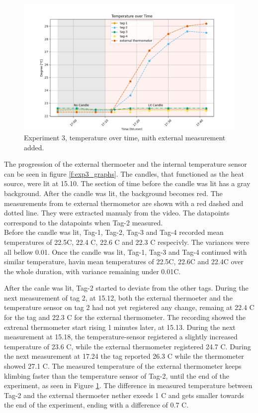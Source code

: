 \begin{figure}[ht!]
	\includegraphics[width=\linewidth]{graphics/exp/exp3_temp_plot_1.png}
	\caption{Experiment 3, temperature over time, mith external measurement added.}
	\label{f:exp3_graphs_temp}
\end{figure}

The progression of the external thermoeter and the internal temperature sensor can be seen in figure \ref{f:exp3_graphs}.
The candles, that functioned as the heat source, were lit at 15.10.
The section of time before the candle was lit has a gray background.
After the candle was lit, the background becomes red.
The measurements from te external thermometor are shown with a red dashed and dotted line.
They were extracted manualy from the video. The datapoints correspond to the datapoints when Tag-2 measured.\\
Before the candle was lit, Tag-1, Tag-2, Tag-3 and Tag-4 recorded mean temperatures of 22.5\degree C, 22.4 \degree C, 22.6 \degree C and 22.3 \degree C respecivly.
The variances were all bellow 0.01\degree.
Once the candle was lit, Tag-1, Tag-3 and Tag-4 continued with similar temperature, havin mean temperatures of 22.5\degree C, 22.6\degree C and 22.4\degree C over the whole duration, with variance remaining under 0.01\degree C.


After the canle was lit, Tag-2 started to deviate from the other tags.
During the next measurement of tag 2, at 15.12, both the external thermoeter and the temperature sensor on tag 2 had not yet registered any change, remaing at 22.4 \degree C for the tag and 22.3 \degree C for the external thermometer.
The recording showed the extrenal thermometer start rising 1 minutes later, at 15.13.
During the next measurement at 15.18, the temperature-sensor registered a slightly increased temperature of 23.6 \degree C, while the external thermometer registered 24.7 \degree C.
During the next measurement at 17.24 the tag reported 26.3 \degree C while the thermometer showed 27.1 \degree C. 
The measured temperature of the external thermometer keeps klimbing faster than the temperature sensor of Tag-2, until the end of the experiment, as seen in Figure \ref{f:exp3_graphs_temp}.
The difference in measured temperature between Tag-2 and the external thermoeter nether exeeds 1 \degree C and gets smaller towards the end of the experiment, ending with a difference of 0.7 \degree C.

